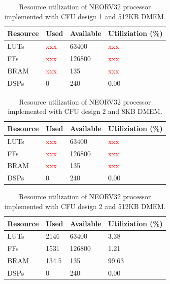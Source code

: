 \begin{table}[H]
\centering
\caption{Resource utilization of NEORV32 processor implemented with CFU design 1 and 512KB DMEM.}
\begin{tabular}{|l|l|l|l|}
\hline
Resource & Used & Available & Utiliziation (\%) \\ \hline
LUTs     & \textcolor{red}{xxx} & 63400     & \textcolor{red}{xxx}              \\ \hline
FFs      & \textcolor{red}{xxx} & 126800    & \textcolor{red}{xxx}              \\ \hline
BRAM     & \textcolor{red}{xxx}    & 135       & \textcolor{red}{xxx}              \\ \hline
DSPs     & 0    & 240       & 0.00              \\ \hline
\end{tabular}
\label{tab:}
\end{table}


\begin{table}[H]
\centering
\caption{Resource utilization of NEORV32 processor implemented with CFU design 2 and 8KB DMEM.}
\begin{tabular}{|l|l|l|l|}
\hline
Resource & Used & Available & Utiliziation (\%) \\ \hline
LUTs     & \textcolor{red}{xxx} & 63400     & \textcolor{red}{xxx}              \\ \hline
FFs      & \textcolor{red}{xxx} & 126800    & \textcolor{red}{xxx}              \\ \hline
BRAM     & \textcolor{red}{xxx}    & 135       & \textcolor{red}{xxx}              \\ \hline
DSPs     & 0    & 240       & 0.00              \\ \hline
\end{tabular}
\label{tab:}
\end{table}


\begin{table}[H]
\centering
\caption{Resource utilization of NEORV32 processor implemented with CFU design 2 and 512KB DMEM.}
\begin{tabular}{|l|l|l|l|}
\hline
Resource & Used & Available & Utiliziation (\%) \\ \hline
LUTs     & 2146 & 63400     & 3.38              \\ \hline
FFs      & 1531 & 126800    & 1.21              \\ \hline
BRAM     & 134.5    & 135       & 99.63              \\ \hline
DSPs     & 0    & 240       & 0.00              \\ \hline
\end{tabular}
\label{tab:}
\end{table}

